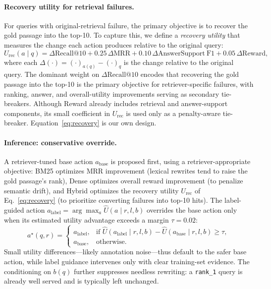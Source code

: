 \documentclass{article}
\begin{document}
\paragraph{Recovery utility for retrieval failures.}
For queries with original-retrieval failure, the primary objective is to recover
the gold passage into the top-10.
To capture this, we define a \emph{recovery utility} that measures the change
each action produces relative to the original query:
\begin{equation}
U_{\text{rec}}(a \mid q) =
\Delta\mathrm{Recall@10}
+ 0.25\,\Delta\mathrm{MRR}
+ 0.10\,\Delta\mathrm{AnswerSupport\ F1}
+ 0.05\,\Delta\mathrm{Reward},
\label{eq:recovery}
\end{equation}
where each $\Delta(\cdot) = (\cdot)_{a(q)} - (\cdot)_{q}$ is the change relative
to the original query. The dominant weight on $\Delta\mathrm{Recall@10}$ encodes
that recovering the gold passage into the top-10 is the primary objective for
retriever-specific failures, with ranking, answer, and overall-utility improvements serving as
secondary tie-breakers. Although Reward already includes retrieval and
answer-support components, its small coefficient in $U_{\text{rec}}$ is used
only as a penalty-aware tie-breaker. Equation~\eqref{eq:recovery} is our own
design.

\paragraph{Inference: conservative override.}
A retriever-tuned base action $a_{\text{base}}$ is proposed first, using a
retriever-appropriate objective: BM25 optimizes MRR improvement (lexical
rewrites tend to raise the gold passage's rank), Dense optimizes overall reward
improvement (to penalize semantic drift), and Hybrid optimizes the recovery
utility $U_{\text{rec}}$ of Eq.~\eqref{eq:recovery} (to prioritize converting
failures into top-10 hits). The label-guided action
$a_{\text{label}} = \arg\max_{a}\widehat{U}(a \mid r,l,b)$ overrides the base
action only when its estimated utility advantage exceeds a margin $\tau = 0.02$:
\begin{equation}
a^{\star}(q, r) =
\begin{cases}
a_{\text{label}}, &
\text{if } \widehat{U}(a_{\text{label}} \mid r,l,b)
            - \widehat{U}(a_{\text{base}} \mid r,l,b) \ge \tau, \\[4pt]
a_{\text{base}}, & \text{otherwise.}
\end{cases}
\label{eq:override}
\end{equation}
Small utility differences---likely annotation noise---thus default to the safer
base action, while label guidance intervenes only with clear training-set
evidence. The conditioning on $b(q)$ further suppresses needless rewriting: a
\texttt{rank\_1} query is already well served and is typically left unchanged.
\end{document}
